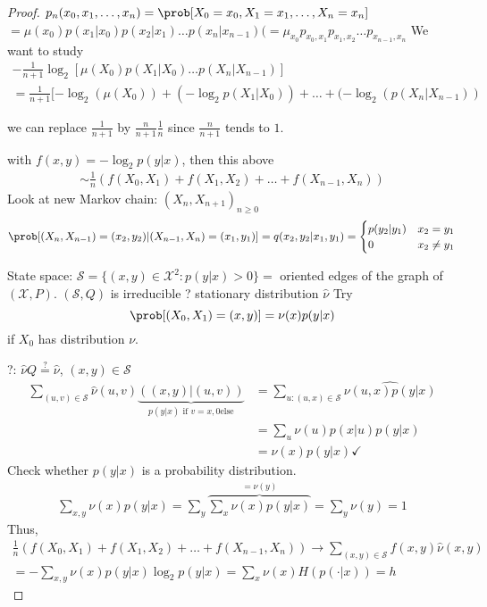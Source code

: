 \documentclass[mfit.tex]{subfiles}
\begin{document}
\begin{proof}
  $p_n(x_0,x_1,\dots,x_n) = \prob[X_0 = x_0,X_1=x_1,\dots,X_n=x_n]$
  $= \mu(x_0) p(x_1|x_0) p(x_2|x_1) \dots p(x_n|x_{n-1}) (= \mu_{x_0} p_{x_0,x_1} p_{x_1,x_2} \dots p_{x_{n-1},x_n}$
  We want to study
  \begin{align*}
    - \frac{1}{n+1} \log_2 [ \mu(X_0) p(X_1|X_0) \dots p(X_n|X_{n-1}) ] \\
    = \frac{1}{n+1} [ -\log_2(\mu(X_0)) + (-\log_2 p(X_1|X_0)) + \dots + (- \log_2(p(X_n|X_{n-1}))
  \end{align*}
  \begin{rem}
    we can replace $\frac{1}{n+1}$ by $\frac{n}{n+1} \frac{1}{n}$ since $\frac{n}{n+1}$ tends to $1$.
  \end{rem}
  with $f(x,y) = - \log_2 p(y|x)$, then this above
  \begin{align*}
    \sim \frac{1}{n} (f(X_0,X_1) + f(X_1,X_2) + \dots + f(X_{n-1},X_n) )
  \end{align*}
  Look at new Markov chain: $(X_n,X_{n+1})_{n \geq 0}$
  \begin{align*}
    \prob[(X_n,X_{n-1}) = (x_2,y_2) | (X_{n-1},X_n) = (x_1,y_1)] = q(x_2,y_2|x_1,y_1) =  \begin{cases} p(y_2|y_1) & x_2 = y_1 \\ 0 & x_2 \neq y_1 \end{cases}
  \end{align*}
  
  State space: $\mathcal{S} = \{(x,y) \in \mathcal{X}^2: p(y|x) > 0 \} = $ oriented edges of the graph of $(\mathcal{X},P)$.
  $(\mathcal{S},Q)$ is irreducible
  ? stationary distribution $\hat{\nu}$
  Try
  \[ \prob[(X_0,X_1) = (x,y)] = \nu(x) p(y|x) \]
  if $X_0$ has distribution $\nu$.
  
  ?: $\hat{\nu} Q \overset{?}{=} \hat{\nu}$, $(x,y) \in \mathcal{S}$
  \begin{align*}
    \sum_{(u,v) \in \mathcal{S}} \hat{\nu}(u,v) \underbrace{((x,y)|(u,v))}_{ p(y|x) \text{ if } v = x, 0 \text{else}}
    &= \sum_{u: (u,x) \in \mathcal{S}} \hat{\nu (u,x) p(y|x)} \\
    &= \sum_{u} \nu(u) p(x|u) p(y|x)\\
    &= \nu(x) p(y|x) \checkmark
  \end{align*}
  Check whether $p(y|x)$ is a probability distribution.
  \begin{align*}
    \sum_{x,y} \nu(x) p(y|x) = \sum_y \overbrace{\sum_x \nu(x) p(y|x)}^{=\nu(y)} =\sum_y \nu(y) = 1
  \end{align*}
  Thus,
  \begin{align*}
    \frac{1}{n} (f(X_0,X_1) + f(X_1,X_2) + \dots + f(X_{n-1},X_n) ) \to \sum_{(x,y) \in \mathcal{S}} f(x,y) \hat{\nu}(x,y) \\
    = - \sum_{x,y} \nu(x) p(y|x) \log_2 p(y|x) = \sum_x \nu(x) H(p(\cdot|x)) = h
  \end{align*}
\end{proof}
\end{document}
